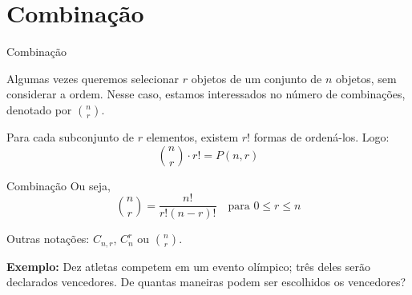\documentclass[9pt]{beamer}
\begin{document}
\section{Combinação}
\begin{frame}{Combinação}

Algumas vezes queremos selecionar $r$ objetos de um conjunto de $n$ objetos, sem considerar a ordem. Nesse caso, estamos interessados no número de combinações, denotado por $\binom{n}{r}$.

\vspace{0.3cm}

Para cada subconjunto de $r$ elementos, existem $r!$ formas de ordená-los. Logo:
\[
\binom{n}{r} \cdot r! = P(n, r)
\]



\begin{center}
\end{center}

\end{frame}
\begin{frame}{Combinação}
Ou seja,
\[
\binom{n}{r} = \frac{n!}{r!(n - r)!} \quad \text{para } 0 \leq r \leq n
\]

Outras notações: $C_{n,r}$, $C_n^r$ ou $\binom{n}{r}$.

\vspace{0.5cm}

\textbf{Exemplo:} Dez atletas competem em um evento olímpico; três deles serão declarados vencedores. De quantas maneiras podem ser escolhidos os vencedores?
\end{frame}
\end{document}
